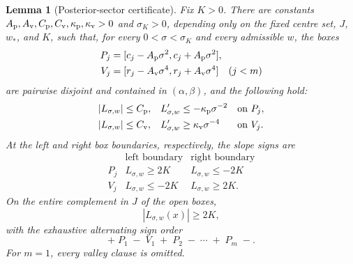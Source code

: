 \documentclass[aps,physrev,onecolumn,amsmath,amssymb,longbibliography]{revtex4-2}
\newtheorem{lemma}[theorem]{Lemma}
\begin{document}
\begin{lemma}[Posterior-sector certificate]
\label{lem:exactmfull-posterior-sectors}
Fix \(K>0\).  There are constants
\(A_{\rm p},A_{\rm v},C_{\rm p},C_{\rm v},
\kappa_{\rm p},\kappa_{\rm v}>0\) and \(\sigma_K>0\), depending only on the
fixed centre set, \(J\), \(w_*\), and \(K\), such that, for every
\(0<\sigma<\sigma_K\) and every admissible \(w\), the boxes
\begin{align}
 P_j&=[c_j-A_{\rm p}\sigma^2,c_j+A_{\rm p}\sigma^2],
 \label{eq:exactmfull-peak-boxes}\\
 V_j&=[r_j-A_{\rm v}\sigma^4,r_j+A_{\rm v}\sigma^4]
 \quad(j<m)
 \label{eq:exactmfull-valley-boxes}
\end{align}
are pairwise disjoint and contained in \((\alpha,\beta)\), and the following
hold:
\begin{align}
 |L_{\sigma,w}|&\le C_{\rm p},&
 L_{\sigma,w}'&\le-\kappa_{\rm p}\sigma^{-2}
 &&\text{on }P_j,
 \label{eq:exactmfull-peak-box-control}\\
 |L_{\sigma,w}|&\le C_{\rm v},&
 L_{\sigma,w}'&\ge \kappa_{\rm v}\sigma^{-4}
 &&\text{on }V_j.
 \label{eq:exactmfull-valley-box-control}
\end{align}
At the left and right box boundaries, respectively, the slope signs are
\begin{equation}
 \begin{array}{c|cc}
 &\text{left boundary}&\text{right boundary}\\ \hline
 P_j&L_{\sigma,w}\ge2K&L_{\sigma,w}\le-2K\\
 V_j&L_{\sigma,w}\le-2K&L_{\sigma,w}\ge2K.
 \end{array}
 \label{eq:exactmfull-box-boundary-signs}
\end{equation}
On the entire complement in \(J\) of the open boxes,
\begin{equation}
 |L_{\sigma,w}(x)|\ge2K,
 \label{eq:exactmfull-complement-margin}
\end{equation}
with the exhaustive alternating sign order
\begin{equation}
 +\;P_1\;-\;V_1\;+\;P_2\;-\;\cdots\;+\;P_m\;-.
 \label{eq:exactmfull-complement-sign-order}
\end{equation}
For \(m=1\), every valley clause is omitted.
\end{lemma}
\end{document}
